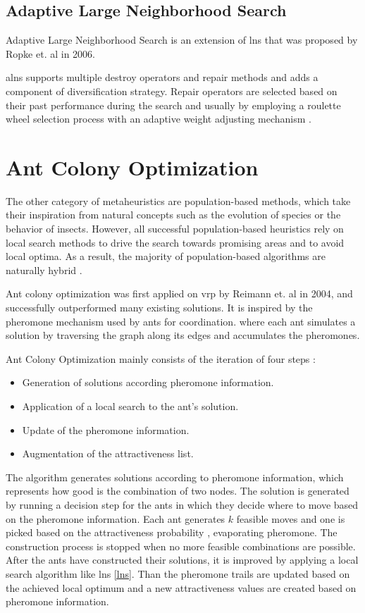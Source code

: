 \subsection{Adaptive Large Neighborhood Search}
Adaptive Large Neighborhood Search is an extension of \gls{lns} that was proposed by Ropke et. al \cite{alns} in 2006.

\gls{alns} supports multiple destroy operators and repair methods and adds a component of diversification strategy. Repair operators are selected based on their past performance during the search and usually by employing a roulette wheel selection process with an adaptive weight adjusting mechanism \cite{alns}.

\section{Ant Colony Optimization}
The other category of metaheuristics are population-based methods, which take their inspiration from natural concepts such as the evolution of species or the behavior of insects. However, all successful population-based heuristics rely on local search methods to drive the search towards promising areas and to avoid local optima. As a result, the majority of population-based algorithms are naturally hybrid \cite{vrp-bible}.

Ant colony optimization was first applied on \gls{vrp} by Reimann et. al \cite{aco} in 2004, and successfully outperformed many existing solutions. It is inspired by the pheromone mechanism used by ants for coordination. where each ant simulates a solution by traversing the graph along its edges and accumulates the pheromones.

Ant Colony Optimization mainly consists of the iteration of four steps \cite{aco}: 
\begin{itemize}
        \item Generation of solutions according pheromone information.
        \item Application of a local search to the ant's solution.
        \item Update of the pheromone information.
        \item Augmentation of the attractiveness list.
\end{itemize}

The algorithm generates solutions according to pheromone information, which represents how good is the combination of two nodes. The solution is generated by running a decision step for the ants in which they decide where to move based on the pheromone information. Each ant generates $k$ feasible moves and one is picked based on the attractiveness probability \cite{aco}, evaporating pheromone. The construction process is stopped when no more feasible combinations are possible. After the ants have constructed their solutions, it is improved by applying a local search algorithm like \gls{lns} \ref{lns}. Than the pheromone trails are updated based on the achieved local optimum \cite{aso-rank} and a new attractiveness values are created based on pheromone information.
